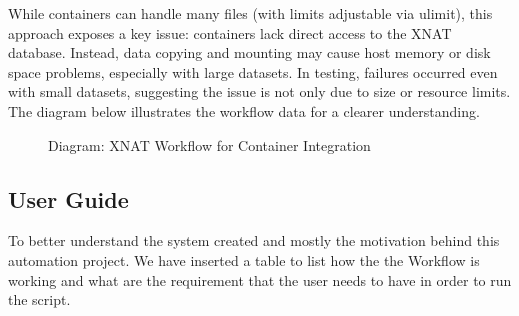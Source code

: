 While containers can handle many files (with limits adjustable via ulimit), this approach exposes a key issue: containers lack direct access to the XNAT database. Instead, data copying and mounting may cause host memory or disk space problems, especially with large datasets. In testing, failures occurred even with small datasets, suggesting the issue is not only due to size or resource limits.
The diagram below illustrates the workflow data for a clearer understanding.  
\begin{figure}[ht]
    \centering
    \def\svgwidth{\linewidth} 
    
    \caption{Diagram: XNAT Workflow for Container Integration}
    \label{fig:workflowxnat}
\end{figure}






\subsection{User Guide}
To better understand the system created and mostly the motivation behind this automation project. We have inserted a table to list how the the Workflow is working and what are the requirement that the user needs to have in order to run the script.

